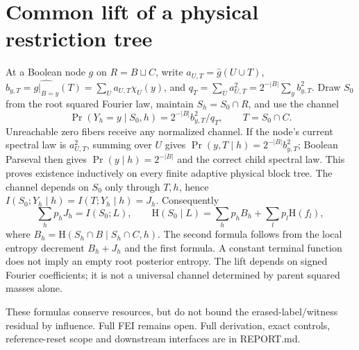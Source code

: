 \documentclass{article}
\newcommand{\HH}{\mathrm H}
\begin{document}
\section*{Common lift of a physical restriction tree}
At a Boolean node $g$ on $R=B\sqcup C$, write
$a_{U,T}=\widehat g(U\cup T)$,
$b_{y,T}=\widehat {g|_{B=y}}(T)=\sum_U a_{U,T}\chi_U(y)$, and
$q_T=\sum_Ua_{U,T}^2=2^{-|B|}\sum_y b_{y,T}^2$.
Draw $S_0$ from the root squared Fourier law, maintain $S_h=S_0\cap R$,
and use the channel
\[
 \Pr(Y_h=y\mid S_0,h)=2^{-|B|}b_{y,T}^2/q_T,
 \qquad T=S_0\cap C.
\]
Unreachable zero fibers receive any normalized channel. If the node's current
spectral law is $a_{U,T}^2$, summing over $U$ gives
$\Pr(y,T\mid h)=2^{-|B|}b_{y,T}^2$; Boolean Parseval then gives
$\Pr(y\mid h)=2^{-|B|}$ and the correct child spectral law.
This proves existence inductively on every finite adaptive physical block tree.
The channel depends on $S_0$ only through $T,h$, hence
$I(S_0;Y_h\mid h)=I(T;Y_h\mid h)=J_h$.
Consequently
\[
 \sum_h p_h J_h=I(S_0;L),\qquad
 \HH(S_0\mid L)=\sum_h p_h B_h+\sum_l p_l\HH(f_l),
\]
where $B_h=\HH(S_h\cap B\mid S_h\cap C,h)$.
The second formula follows from the local entropy decrement $B_h+J_h$
and the first formula. A constant terminal function does not imply an empty
root posterior entropy. The lift depends on signed Fourier coefficients;
it is not a universal channel determined by parent squared masses alone.

These formulas conserve resources, but do not bound the erased-label/witness
residual by influence. Full FEI remains open. Full derivation, exact controls,
reference-reset scope and downstream interfaces are in REPORT.md.
\end{document}
